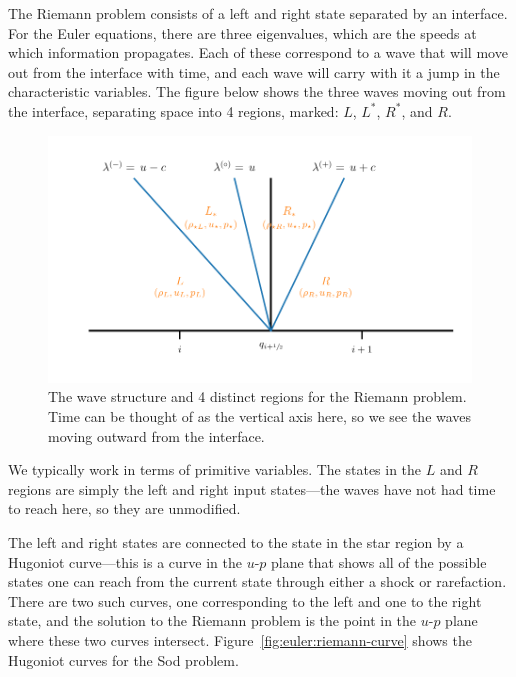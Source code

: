 The Riemann problem consists of a left and right state separated by an
interface.  For the Euler equations, there are three eigenvalues, which
are the speeds at which information propagates.  Each of these
correspond to a wave that will move out from the interface with time,
and each wave will carry with it a jump in the characteristic variables.  The
figure below shows the three waves moving out from the interface,
separating space into 4 regions, marked: $L$, $L^*$, $R^*$, and $R$.
\begin{figure}[h]
\centering
\includegraphics[width=4.5in]{riemann-waves}
\caption[The Riemann problem wave struction for the Euler
  equations.]{The wave structure and 4 distinct regions for the
  Riemann problem.  Time can be thought of as the vertical axis here,
  so we see the waves moving outward from the interface.}
\end{figure} 
We typically work in terms of primitive variables.  The states in the
$L$ and $R$ regions are simply the left and right input states---the
waves have not had time to reach here, so they are unmodified.

The left and right states are connected to the state in the star
region by a Hugoniot curve---this is a curve in the $u$-$p$
plane that shows all of the possible states one can reach from 
the current state through either a shock or rarefaction.  There
are two such curves, one corresponding to the left and one to the right
state, and the solution to the Riemann problem is the point in
the $u$-$p$ plane where these two curves intersect.  Figure~\ref{fig:euler:riemann-curve}
shows the Hugoniot curves for the Sod problem.

